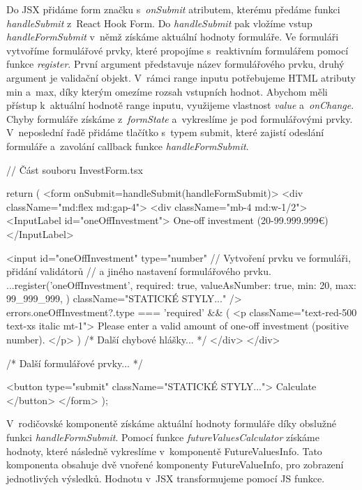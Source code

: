 Do JSX přidáme form značku s~\emph{onSubmit} atributem, kterému předáme funkci \emph{handleSubmit} z~React Hook Form. Do \emph{handleSubmit} pak vložíme vstup \emph{handleFormSubmit} v~němž získáme aktuální hodnoty formuláře. 
Ve formuláři vytvoříme formulářové prvky, které propojíme s~reaktivním formulářem pomocí funkce \emph{register}. První argument představuje název formulářového prvku, druhý argument je validační objekt. 
V~rámci range inputu potřebujeme HTML atributy min a~max, díky kterým omezíme rozsah vstupních hodnot. Abychom měli přístup k~aktuální hodnotě range inputu, využijeme vlastnost \emph{value} a~\emph{onChange}. 
Chyby formuláře získáme z~\emph{formState} a~vykreslíme je pod formulářovými prvky. V~neposlední řadě přidáme tlačítko s~typem submit, které zajistí odeslání formuláře a~zavolání callback funkce \emph{handleFormSubmit}.

\begin{prog}
// Část souboru InvestForm.tsx

return (
  <form onSubmit={handleSubmit(handleFormSubmit)}>
    <div className="md:flex md:gap-4">
      <div className="mb-4 md:w-1/2">
        <InputLabel id="oneOffInvestment">
          One-off investment (20-99.999.999€)
        </InputLabel>

        <input
          id="oneOffInvestment"
          type="number"
          // Vytvoření prvku ve formuláři, přidání validátorů 
          // a jiného nastavení formulářového prvku.
          {...register('oneOffInvestment', {
            required: true,
            valueAsNumber: true,
            min: 20,
            max: 99_999_999,
          })}
          className="STATICKÉ STYLY..."
        />
        {errors.oneOffInvestment?.type === 'required' && (
          <p className="text-red-500 text-xs italic mt-1">
            Please enter a valid amount of one-off investment (positive number).
          </p>
        )}
        {/* Další chybové hlášky... */}
      </div>
    </div>

    {/* Další formulářové prvky... */}

    <button type="submit" className="STATICKÉ STYLY...">
      Calculate
    </button>
  </form>
);
\end{prog}

V~rodičovské komponentě získáme aktuální hodnoty formuláře díky obslužné funkci \emph{handleFormSubmit}. Pomocí funkce \emph{futureValuesCalculator} získáme hodnoty, které následně vykreslíme v~komponentě FutureValuesInfo. 
Tato komponenta obsahuje dvě vnořené komponenty FutureValueInfo, pro zobrazení jednotlivých výsledků. Hodnotu v~JSX transformujeme pomocí JS funkce.


